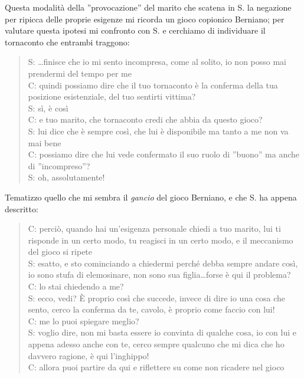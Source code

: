 \noindent Questa modalità della ''provocazione'' del marito che scatena in S. la negazione per ripicca delle proprie esigenze mi ricorda un  gioco copionico Berniano; per valutare questa ipotesi mi confronto con S. e cerchiamo di individuare il tornaconto che entrambi traggono:

\begin{verse}
S: \ldots{}finisce che io mi sento incompresa, come al solito, io non posso mai prendermi del tempo per me\\
C: quindi possiamo dire che il tuo tornaconto è la conferma della tua posizione esistenziale, del tuo sentirti vittima?\\
S: sì, è così\\
C: e tuo marito, che tornaconto credi che abbia da questo gioco?\\
S: lui dice che è sempre così, che lui è disponibile ma tanto a me non va mai bene\\
C: possiamo dire che lui vede confermato il suo ruolo di ''buono'' ma anche di  ''incompreso''?\\
S: oh, assolutamente!
\end{verse}

\noindent {}Tematizzo quello che mi sembra il \emph{gancio}  del gioco Berniano, e che S. ha appena descritto:
\begin{verse}
C: perciò, quando hai un'esigenza personale chiedi a tuo marito, lui ti risponde in un certo modo, tu reagisci in un certo modo, e il meccanismo del gioco si ripete\\
S: esatto, e sto cominciando a chiedermi perché debba sempre andare così, io sono stufa di elemosinare, non sono sua figlia\ldots forse è qui il problema?\\
C: lo stai chiedendo a me?\\
S: ecco, vedi? \`{E} proprio così che succede, invece di dire io una cosa che sento, cerco la conferma da te, cavolo, è proprio come faccio con lui!\\
C: me lo puoi spiegare meglio?\\
S: voglio dire, non mi basta essere io convinta di qualche cosa, io con lui e appena adesso anche con te, cerco sempre qualcuno che mi dica che ho davvero ragione, è qui l'inghippo!\\
C: allora puoi partire da qui e riflettere su come non ricadere nel gioco\\
\end{verse}

